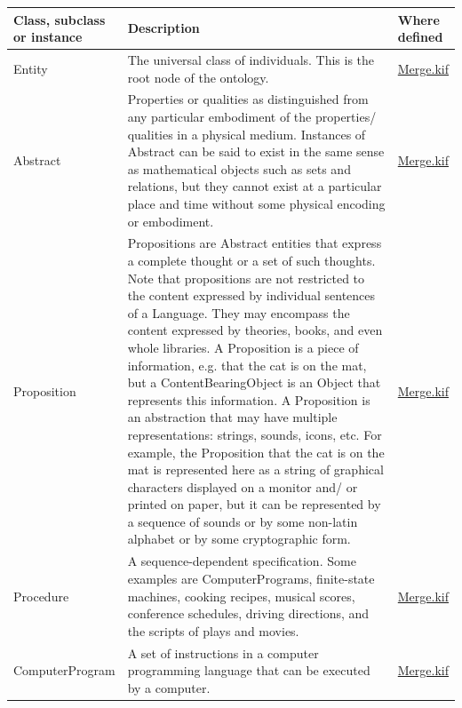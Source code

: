 \documentclass[]{report}
\begin{document}
\begin{table}[H]
  \scriptsize
  \centering
  \begin{tabular}{p{0.2\linewidth}|p{0.7\linewidth}|p{0.1\linewidth}|}
    \textbf{Class, subclass or instance} &
    \textbf{Description} &
    \textbf{Where defined} \\
    \hline
    Entity &
    The universal class of individuals. This is the root node of the ontology. &
    \href{https://github.com/ontologyportal/sumo/blob/master/Merge.kif}{Merge.kif}\\
    \hline
    Abstract &
    Properties or qualities as distinguished from any particular embodiment of
    the properties/ qualities in a physical medium. Instances of Abstract can be
    said to exist in the same sense as mathematical objects such as sets and
    relations, but they cannot exist at a particular place and time without some
    physical encoding or embodiment. &
    \href{https://github.com/ontologyportal/sumo/blob/master/Merge.kif}{Merge.kif}\\
    \hline
    Proposition &
    Propositions are Abstract entities that express a complete thought or a set of
such thoughts. Note that propositions are not restricted to the content
expressed by individual sentences of a Language. They may encompass the content
expressed by theories, books, and even whole libraries. A Proposition is a piece
of information, e.g. that the cat is on the mat, but a ContentBearingObject is
an Object that represents this information. A Proposition is an abstraction that
may have multiple representations: strings, sounds, icons, etc. For example, the
Proposition that the cat is on the mat is represented here as a string of
graphical characters displayed on a monitor and/ or printed on paper, but it can
be represented by a sequence of sounds or by some non-latin alphabet or by some
cryptographic form. &
    \href{https://github.com/ontologyportal/sumo/blob/master/Merge.kif}{Merge.kif}\\
    \hline
    Procedure &
    A sequence-dependent specification. Some examples are ComputerPrograms,
finite-state machines, cooking recipes, musical scores, conference schedules,
driving directions, and the scripts of plays and movies. &
    \href{https://github.com/ontologyportal/sumo/blob/master/Merge.kif}{Merge.kif}\\
    \hline
    ComputerProgram &
    A set of instructions in a computer programming language that can be
    executed by a computer. &
    \href{https://github.com/ontologyportal/sumo/blob/master/Merge.kif}{Merge.kif}\\

\end{tabular}
\end{table}
\end{document}
